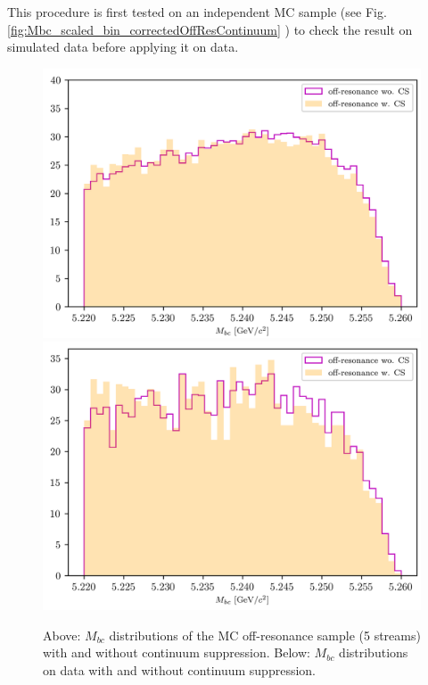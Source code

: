 \noindent This procedure is first tested on an independent MC sample (see Fig. \ref{fig:Mbc_scaled_bin_correctedOffResContinuum} ) to check the result on simulated data before applying it on data.

\begin{figure}[H]
\centering
\subcaptionbox{\label{fig:corrLambdaC_OffResonance_w_wo_CS_comparison_5streams}}
{\includegraphics[width=.65\textwidth]{04-chargedCorrBtoLambda/figs/corrLambdaC_OffResonance_w_wo_CS_comparison_5streams.png}} 
\subcaptionbox{\label{fig:corrLambdaC_OffResonance_w_wo_CS_comparison_Data}}
{\includegraphics[width=.65\textwidth]{04-chargedCorrBtoLambda/figs/corrLambdaC_OffResonance_w_wo_CS_comparison_Data.png}} 
\caption{Above: $M_{bc}$ distributions of the MC off-resonance sample (5 streams) with and without continuum suppression. Below: $M_{bc}$ distributions on data with and without continuum suppression.}
\end{figure}




